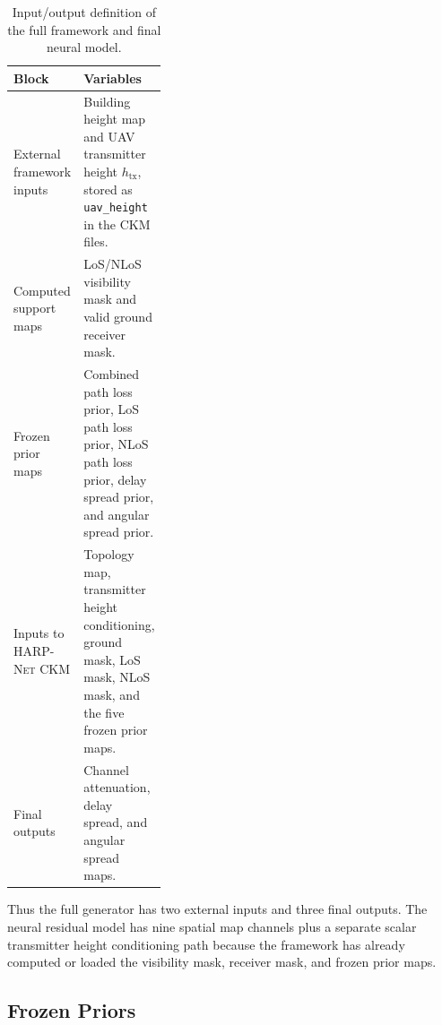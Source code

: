 \documentclass[journal]{IEEEtran}
\begin{document}
\begin{table}[!t]
\centering
\caption{Input/output definition of the full framework and final neural model.}
\label{tab:io-definition-paper}
\scriptsize
\setlength{\tabcolsep}{3pt}
\begin{tabularx}{\linewidth}{p{0.34\linewidth}X}
\toprule
Block & Variables \\
\midrule
External framework inputs &
Building height map and UAV transmitter height \(h_{\mathrm{tx}}\), stored as \texttt{uav\_height} in the CKM files. \\
Computed support maps &
LoS/NLoS visibility mask and valid ground receiver mask. \\
Frozen prior maps &
Combined path loss prior, LoS path loss prior, NLoS path loss prior,
delay spread prior, and angular spread prior. \\
Inputs to \textsc{HARP-Net CKM} &
Topology map, transmitter height conditioning, ground mask, LoS mask, NLoS mask,
and the five frozen prior maps. \\
Final outputs &
Channel attenuation, delay spread, and angular spread maps. \\
\bottomrule
\end{tabularx}
\end{table}

Thus the full generator has two external inputs and three final outputs. The
neural residual model has nine spatial map channels plus a separate scalar
transmitter height conditioning path because the framework has already computed
or loaded the visibility mask, receiver mask, and frozen prior maps.

\subsection{Frozen Priors}
\end{document}

